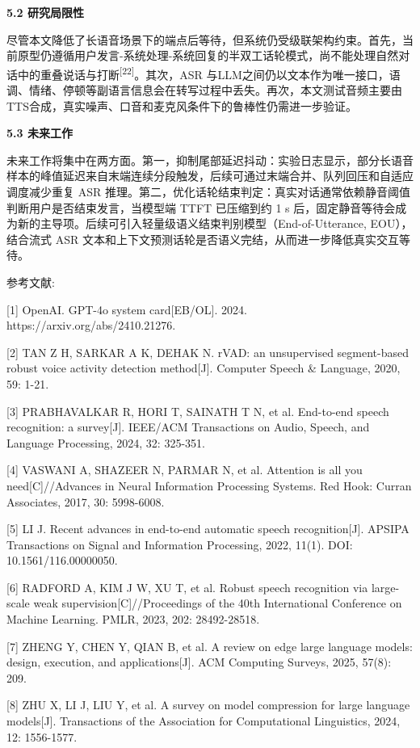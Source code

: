 \documentclass[
]{article}
\begin{document}
\textbf{5.2 研究局限性}

尽管本文降低了长语音场景下的端点后等待，但系统仍受级联架构约束。首先，当前原型仍遵循用户发言-系统处理-系统回复的半双工话轮模式，尚不能处理自然对话中的重叠说话与打断\textsuperscript{{[}22{]}}。其次，ASR 与LLM之间仍以文本作为唯一接口，语调、情绪、停顿等副语言信息会在转写过程中丢失。再次，本文测试音频主要由TTS合成，真实噪声、口音和麦克风条件下的鲁棒性仍需进一步验证。

\textbf{5.3 未来工作}

未来工作将集中在两方面。第一，抑制尾部延迟抖动：实验日志显示，部分长语音样本的峰值延迟来自末端连续分段触发，后续可通过末端合并、队列回压和自适应调度减少重复 ASR 推理。第二，优化话轮结束判定：真实对话通常依赖静音阈值判断用户是否结束发言，当模型端 TTFT 已压缩到约 1 s 后，固定静音等待会成为新的主导项。后续可引入轻量级语义结束判别模型（End-of-Utterance, EOU），结合流式 ASR 文本和上下文预测话轮是否语义完结，从而进一步降低真实交互等待。

参考文献:

{[}1{]} OpenAI. GPT-4o system card{[}EB/OL{]}. 2024. https://arxiv.org/abs/2410.21276.

{[}2{]} TAN Z H, SARKAR A K, DEHAK N. rVAD: an unsupervised segment-based robust voice activity detection method{[}J{]}. Computer Speech \& Language, 2020, 59: 1-21.

{[}3{]} PRABHAVALKAR R, HORI T, SAINATH T N, et al. End-to-end speech recognition: a survey{[}J{]}. IEEE/ACM Transactions on Audio, Speech, and Language Processing, 2024, 32: 325-351.

{[}4{]} VASWANI A, SHAZEER N, PARMAR N, et al. Attention is all you need{[}C{]}//Advances in Neural Information Processing Systems. Red Hook: Curran Associates, 2017, 30: 5998-6008.

{[}5{]} LI J. Recent advances in end-to-end automatic speech recognition{[}J{]}. APSIPA Transactions on Signal and Information Processing, 2022, 11(1). DOI: 10.1561/116.00000050.

{[}6{]} RADFORD A, KIM J W, XU T, et al. Robust speech recognition via large-scale weak supervision{[}C{]}//Proceedings of the 40th International Conference on Machine Learning. PMLR, 2023, 202: 28492-28518.

{[}7{]} ZHENG Y, CHEN Y, QIAN B, et al. A review on edge large language models: design, execution, and applications{[}J{]}. ACM Computing Surveys, 2025, 57(8): 209.

{[}8{]} ZHU X, LI J, LIU Y, et al. A survey on model compression for large language models{[}J{]}. Transactions of the Association for Computational Linguistics, 2024, 12: 1556-1577.
\end{document}
